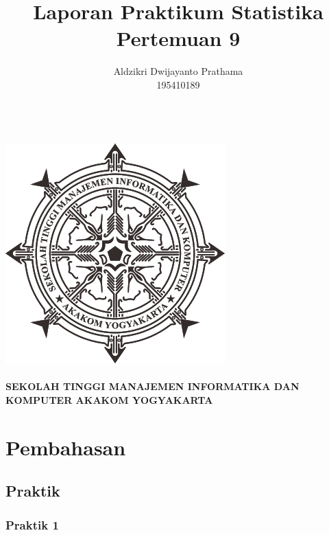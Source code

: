 \documentclass[a4paper,12pt]{article}
\begin{document}
\title{Laporan Praktikum Statistika Pertemuan 9}
\author{Aldzikri Dwijayanto Prathama 
	\\195410189}
\makeatletter
\begin{titlepage}
	\begin{center}
		{\huge \bfseries \@title }\\[14ex]
		\includegraphics[scale=.8]{logo}\\[4ex]
		{\large \@author}\\[20ex]
		{\large \bfseries {SEKOLAH TINGGI MANAJEMEN INFORMATIKA DAN KOMPUTER
				AKAKOM YOGYAKARTA}}
	\end{center}


\end{titlepage}
\makeatother
\newpage
\tableofcontents
\newpage
\section{Pembahasan}
\subsection{Praktik}
\subsubsection{Praktik 1}
\end{document}
